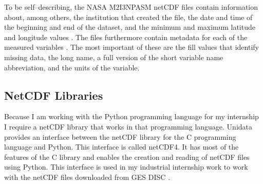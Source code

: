 \documentclass[../00_main.tex]{subfiles}
\begin{document}
To be self--describing, the NASA M2I3NPASM netCDF files contain information
about, among others, the institution that created the file, the date and time of the
beginning and end of the dataset, and the minimum and maximum latitude and
longitude values \cite{merra2-files}. 
The files furthermore contain metadata for each of the
measured variables \cite{merra2-files}. The most important of these are the fill values
that identify missing data, the long name, a full version 
of the short variable name abbreviation, and the units of the variable.

\subsection{NetCDF Libraries}

Because I am working with the Python programming language for my internship
I require a netCDF library that works in that programming language. Unidata
provides an interface between the netCDF library for the C programming language
and Python. This interface is called netCDF4. It has most of the features of
the C library and enables the creation and reading of netCDF files using
Python. This interface is used in my industrial internship work to work with
the netCDF files downloaded from GES DISC \cite{netcdf4}.
\end{document}
